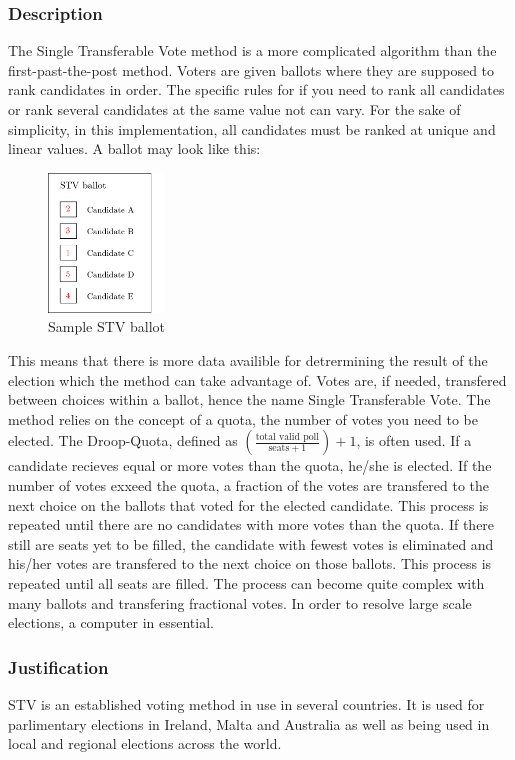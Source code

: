 \documentclass[12pt]{article}
\begin{document}
\subsubsection{Description}
The Single Transferable Vote method is a more complicated algorithm than the first-past-the-post method. Voters are given ballots where they are supposed to rank candidates in order. The specific rules for if you need to rank all candidates or rank several candidates at the same value not can vary. For the sake of simplicity, in this implementation, all candidates must be ranked at unique and linear values. A ballot may look like this:
\begin{figure}[H]
	\centering
	\includegraphics[height=140px]{ballot}
	\caption{Sample STV ballot}
	\label{STV ballot}
\end{figure}
This means that there is more data availible for detrermining the result of the election which the method can take advantage of. Votes are, if needed, transfered between choices within a ballot, hence the name Single Transferable Vote. The method relies on the concept of a quota, the number of votes you need to be elected. The Droop-Quota, defined as $(\frac{\text{total valid poll}}{\text{seats} + 1})+1$, is often used. If a candidate recieves equal or more votes than the quota, he/she is elected. If the number of votes exxeed the quota, a fraction of the votes are transfered to the next choice on the ballots that voted for the elected candidate. This process is repeated until there are no candidates with more votes than the quota. If there still are seats yet to be filled, the candidate with fewest votes is eliminated and his/her votes are transfered to the next choice on those ballots. This process is repeated until all seats are filled. The process can become quite complex with many ballots and transfering fractional votes. In order to resolve large scale elections, a computer in essential.
\subsubsection{Justification}
STV is an established voting method in use in several countries. It is used for parlimentary elections in Ireland, Malta and Australia as well as being used in local and regional elections across the world.
\end{document}
